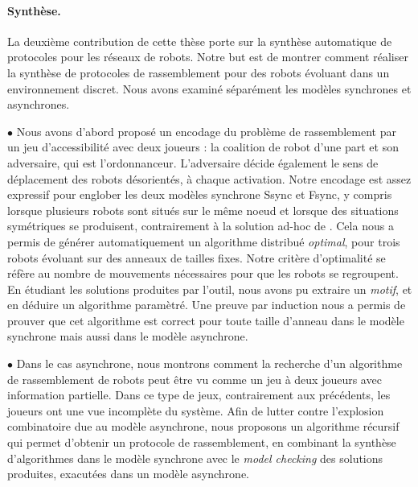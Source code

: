 \paragraph{Synthèse.} La deuxième contribution de cette thèse porte
sur la synthèse automatique de protocoles pour les réseaux de robots.
Notre but est de montrer comment réaliser la synthèse de protocoles de
rassemblement pour des robots évoluant dans un environnement discret.
Nous avons examiné séparément les modèles synchrones et asynchrones.

$\bullet$ Nous avons d'abord proposé un encodage du problème de
rassemblement par un jeu d'accessibilité avec deux joueurs : la
coalition de robot d'une part et son adversaire, qui est
l'ordonnanceur. L'adversaire décide également le sens de déplacement
des robots désorientés, à chaque activation. Notre encodage est assez
expressif pour englober les deux modèles synchrone Ssync et Fsync, y
compris lorsque plusieurs robots sont situés sur le même noeud et
lorsque des situations symétriques se produisent, contrairement à la
solution ad-hoc de \cite{BDPPT12c}.  Cela nous a permis de générer
automatiquement un algorithme distribué \emph{optimal}, pour trois
robots évoluant sur des anneaux de tailles fixes. Notre critère
d'optimalité se réfère au nombre de mouvements nécessaires pour que
les robots se regroupent.  En étudiant les solutions produites par
l'outil, nous avons pu extraire un \emph{motif}, et en déduire un
algorithme paramètré. Une preuve par induction nous a permis de
prouver que cet algorithme est correct pour toute taille d'anneau dans
le modèle synchrone mais aussi dans le modèle asynchrone.

$\bullet$ Dans le cas asynchrone, nous montrons comment la recherche
d'un algorithme de rassemblement de robots peut être vu comme un jeu à
deux joueurs avec information partielle.  Dans ce type de jeux,
contrairement aux précédents, les joueurs ont une vue incomplète du
système.  Afin de lutter contre l'explosion combinatoire due au modèle
asynchrone, nous proposons un algorithme récursif qui permet d'obtenir
un protocole de rassemblement, en combinant la synthèse d'algorithmes
dans le modèle synchrone avec le \emph{model checking} des solutions
produites, exacutées dans un modèle asynchrone.

	
	
